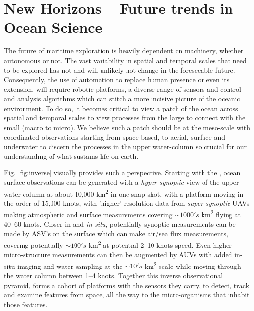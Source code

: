 \section{New Horizons -- Future trends in Ocean Science}
\label{sec:future}

The future of maritime exploration is heavily dependent on machinery,
whether autonomous or not. The vast variability in spatial and
temporal scales that need to be explored has not and will unlikely not
change in the foreseeable future. Consequently, the use of automation
to replace human presence or even its extension, will require robotic
platforms, a diverse range of sensors and control and analysis
algorithms which can stitch a more incisive picture of the oceanic
environment. To do so, it becomes critical to view a patch of the
ocean across spatial and temporal scales to view processes from the
large to connect with the small (macro to micro). We believe such a
patch should be at the meso-scale with coordinated observations
starting from space based, to aerial, surface and underwater to
discern the processes in the upper water-column so crucial for our
understanding of what sustains life on earth.

Fig. \ref{fig:inverse} visually provides such a perspective. Starting
with the \smle, ocean surface observations can be generated with a
\emph{hyper-synoptic} view of the upper water-column at about 10,000
km\textsuperscript{2} in one snap-shot, with a platform moving in the
order of 15,000 knots, with 'higher' resolution data from
\emph{super-synoptic} UAVs making atmospheric and surface measurements
covering $\sim 1000's$ km\textsuperscript{2} flying at 40--60
knots. Closer in and \emph{in-situ}, potentially synoptic measurements
can be made by ASV's on the surface which can make air/sea flux
measurements, covering potentially $\sim 100's$ km\textsuperscript{2} at
potential 2--10 knots speed. Even higher micro-structure measurements
can then be augmented by AUVs with added in-situ imaging and
water-sampling at the $\sim 10's$ km\textsuperscript{2} scale while
moving through the water column between 1--4 knots. Together this
inverse observational pyramid, forms a cohort of platforms with the
sensors they carry, to detect, track and examine features from space,
all the way to the micro-organisms that inhabit those features.

